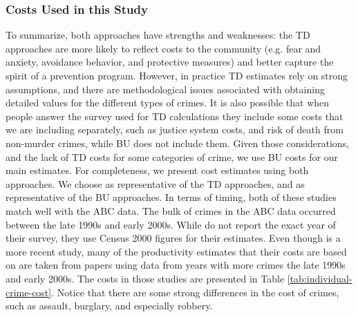 \subsubsection{Costs Used in this Study}
\noindent To summarize, both approaches have strengths and weaknesses: the TD approaches are more likely to reflect costs to the community (e.g. fear and anxiety, avoidance behavior, and protective measures) and better capture the spirit of a prevention program. However, in practice TD estimates rely on strong assumptions, and there are methodological issues associated with obtaining detailed values for the different types of crimes. It is also possible that when people answer the survey used for TD calculations they include some costs that we are including separately, such as justice system costs, and risk of death from non-murder crimes, while BU does not include them. Given those considerations, and the lack of TD costs for some categories of crime, we use BU costs for our main estimates. For completeness, we present cost estimates using both approaches. We choose \cite{Cohen_Rust_etal_2004_Criminology} as representative of the TD approaches, and \cite{McCollister_etal_2010_DAD} as representative of the BU approaches. In terms of timing, both of these studies match well with the ABC data. The bulk of crimes in the ABC data occurred between the late 1990s and early 2000s. While \cite{Cohen_Rust_etal_2004_Criminology} do not report the exact year of their survey, they use Census 2000 figures for their estimates. Even though \cite{McCollister_etal_2010_DAD} is a more recent study, many of the productivity estimates that their costs are based on are taken from papers using data from years with more crimes the late 1990s and early 2000s. The costs in those studies are presented in Table \ref{tab:individual-crime-cost}. Notice that there are some strong differences in the cost of crimes, such as assault, burglary, and especially robbery. \\


